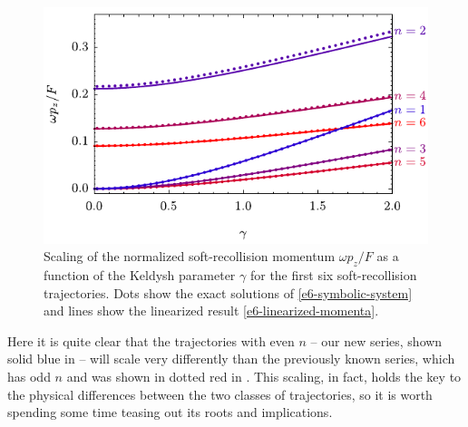 \begin{figure}[htb]
  \centering
  \includegraphics[scale=1]{6-LES/Figures/figure6-2E.pdf}
  \caption[
  Scaling of the soft-recollision momentum as a function of the Keldysh parameter
  ]{
  Scaling of the normalized soft-recollision momentum $\omega p_z/F$ as a function of the Keldysh parameter $\gamma$ for the first six soft-recollision trajectories. Dots show the exact solutions of \eqref{e6-symbolic-system} and lines show the linearized result \eqref{e6-linearized-momenta}.
  }
  \label{f6-soft-recollision-scaling}  
\end{figure}

Here it is quite clear that the trajectories with even $n$ -- our new series, shown solid blue in  -- will scale very differently than the previously known series, which has odd $n$ and was shown in dotted red in . This scaling, in fact, holds the key to the physical differences between the two classes of trajectories, so it is worth spending some time teasing out its roots and implications.

